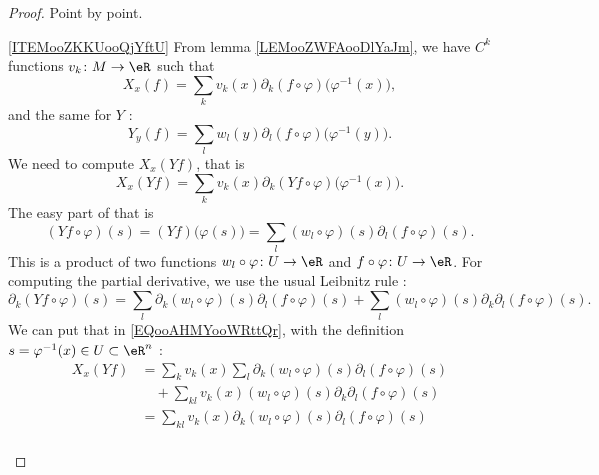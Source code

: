 \begin{proof}
    Point by point.
    \begin{subproof}
        \item[\ref{ITEMooZKKUooQjYftU}]
            From lemma \ref{LEMooZWFAooDlYaJm}, we have \( C^k\) functions \( v_k\colon M\to \eR\) such that
            \begin{equation}
                X_x(f)=\sum_kv_k(x)\partial_k(f\circ \varphi)\big( \varphi^{-1}(x) \big),
            \end{equation}
            and the same for \( Y\) :
            \begin{equation}
                Y_y(f)=\sum_lw_l(y)\partial_l(f\circ\varphi)\big( \varphi^{-1}(y) \big).
            \end{equation}
            We need to compute \( X_x(Yf)\), that is
            \begin{equation}        \label{EQooAHMYooWRttQr}
                X_x(Yf)=\sum_kv_k(x)\partial_k(Yf\circ\varphi)\big( \varphi^{-1}(x) \big).
            \end{equation}
            The easy part of that is
            \begin{equation}
                (Yf\circ\varphi)(s)=(Yf)\big( \varphi(s) \big)=\sum_l(w_l\circ\varphi)(s)\partial_l(f\circ \varphi)(s).
            \end{equation}
            This is a product of two functions \( w_l\circ\varphi\colon U\to \eR\) and \( f\circ\varphi\colon U\to \eR\). For computing the partial derivative, we use the usual Leibnitz rule :
            \begin{equation}
                \partial_k(Yf\circ\varphi)(s)=\sum_{l}\partial_k(w_l\circ\varphi)(s)\partial_l(f\circ\varphi)(s)+\sum_l(w_l\circ\varphi)(s)\partial_k\partial_l(f\circ\varphi)(s).
            \end{equation}
            We can put that in \eqref{EQooAHMYooWRttQr}, with the definition \( s=\varphi^{-1}(x)\in U\subset \eR^n\) :
            \begin{subequations}
                \begin{align}
                    X_x(Yf)&=\sum_kv_k(x)\sum_l\partial_k(w_l\circ\varphi)(s)\partial_l(f\circ\varphi)(s)\\
                    &\quad +\sum_{kl}v_k(x)(w_l\circ\varphi)(s)\partial_k\partial_l(f\circ\varphi)(s)\\
                    &=\sum_{kl}v_k(x)\partial_k(w_l\circ\varphi)(s)\partial_l(f\circ\varphi)(s)\\

\end{align}
\end{subequations}
\end{subproof}
\end{proof}
